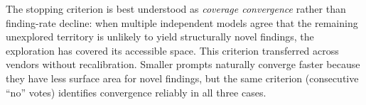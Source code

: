 The stopping criterion is best understood as \emph{coverage convergence}
rather than finding-rate decline: when multiple independent models agree
that the remaining unexplored territory is unlikely to yield
structurally novel findings, the exploration has covered its accessible
space. This criterion transferred across vendors without recalibration.
Smaller prompts naturally converge faster because they have less surface
area for novel findings, but the same criterion (consecutive ``no''
votes) identifies convergence reliably in all three cases.

